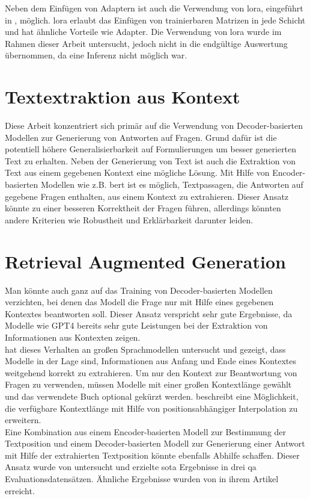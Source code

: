 Neben dem Einfügen von Adaptern ist auch die Verwendung von \ac{lora}, eingeführt in \citet{lora}, möglich.
\ac{lora} erlaubt das Einfügen von trainierbaren Matrizen in jede Schicht und hat ähnliche Vorteile wie Adapter.
Die Verwendung von \ac{lora} wurde im Rahmen dieser Arbeit untersucht, jedoch nicht in die endgültige Auswertung übernommen, da eine Inferenz nicht möglich war.

\section{Textextraktion aus Kontext}
Diese Arbeit konzentriert sich primär auf die Verwendung von Decoder-basierten Modellen zur Generierung von Antworten auf Fragen.
Grund dafür ist die potentiell höhere Generalisierbarkeit auf Formulierungen um besser generierten Text zu erhalten.
Neben der Generierung von Text ist auch die Extraktion von Text aus einem gegebenen Kontext eine mögliche Lösung.
Mit Hilfe von Encoder-basierten Modellen wie z.B. \ac{bert} ist es möglich, Textpassagen, die Antworten auf gegebene Fragen enthalten, aus einem Kontext zu extrahieren.
Dieser Ansatz könnte zu einer besseren Korrektheit der Fragen führen, allerdings könnten andere Kriterien wie Robustheit und Erklärbarkeit darunter leiden.\\

\section{Retrieval Augmented Generation}
Man könnte auch ganz auf das Training von Decoder-basierten Modellen verzichten, bei denen das Modell die Frage nur mit Hilfe eines gegebenen Kontextes beantworten soll.
Dieser Ansatz verspricht sehr gute Ergebnisse, da Modelle wie GPT4 bereits sehr gute Leistungen bei der Extraktion von Informationen aus Kontexten zeigen.\\

\citet{context-extract} hat dieses Verhalten an großen Sprachmodellen untersucht und gezeigt, dass Modelle in der Lage sind, Informationen aus Anfang und Ende eines Kontextes weitgehend korrekt zu extrahieren.
Um nur den Kontext zur Beantwortung von Fragen zu verwenden, müssen Modelle mit einer großen Kontextlänge gewählt und das verwendete Buch optional gekürzt werden. \citet{extending-context} beschreibt eine Möglichkeit, die verfügbare Kontextlänge mit Hilfe von positionsabhängiger Interpolation zu erweitern.\\
Eine Kombination aus einem Encoder-basierten Modell zur Bestimmung der Textposition und einem Decoder-basierten Modell zur Generierung einer Antwort mit Hilfe der extrahierten Textposition könnte ebenfalls Abhilfe schaffen. Dieser Ansatz wurde von \citet{retrieval-1} untersucht und erzielte \ac{sota} Ergebnisse in drei \ac{qa} Evaluationsdatensätzen. Ähnliche Ergebnisse wurden von \citet{retrieval-2} in ihrem Artikel erreicht.\\


